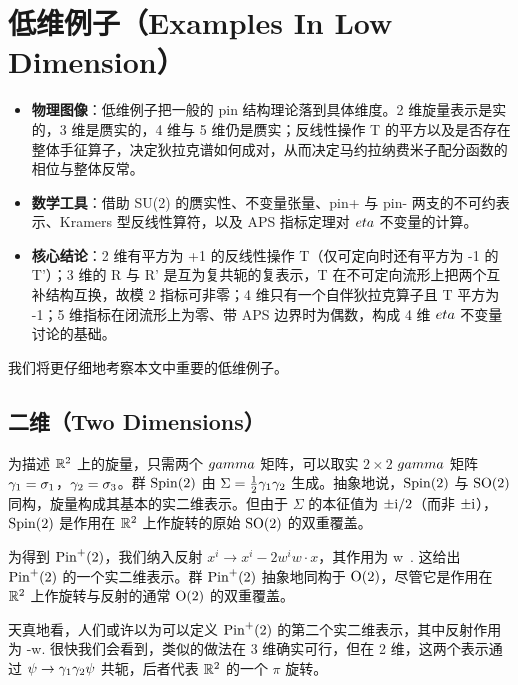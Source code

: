 \section{低维例子（Examples In Low Dimension）}\label{examples}

\begin{keytakeaways}
\begin{itemize}[leftmargin=1.6em,itemsep=0.2em,topsep=0.2em]
  \item \textbf{物理图像}：低维例子把一般的 pin 结构理论落到具体维度。2 维旋量表示是实的，3 维是赝实的，4 维与 5 维仍是赝实；反线性操作 T 的平方以及是否存在整体手征算子，决定狄拉克谱如何成对，从而决定马约拉纳费米子配分函数的相位与整体反常。
  \item \textbf{数学工具}：借助 SU(2) 的赝实性、不变量张量、pin+ 与 pin- 两支的不可约表示、Kramers 型反线性算符，以及 APS 指标定理对 $\\eta$ 不变量的计算。
  \item \textbf{核心结论}：2 维有平方为 +1 的反线性操作 T（仅可定向时还有平方为 -1 的 T'）；3 维的 R 与 R' 是互为复共轭的复表示，T 在不可定向流形上把两个互补结构互换，故模 2 指标可非零；4 维只有一个自伴狄拉克算子且 T 平方为 -1；5 维指标在闭流形上为零、带 APS 边界时为偶数，构成 4 维 $\\eta$ 不变量讨论的基础。
\end{itemize}
\end{keytakeaways}

我们将更仔细地考察本文中重要的低维例子。

\subsection{二维（Two Dimensions）}\label{twod}

为描述 ${\mathbb{R}}^2$ 上的旋量，只需两个 $\\gamma$ 矩阵，可以取实 $2\times 2$ $\\gamma$ 矩阵 ${\gamma}_1=\sigma_1$，${\gamma}_2=\sigma_3$。群 ${\mathrm{Spin}}(2)$ 由 $\Sigma=\frac{1}{2}{\gamma}_1{\gamma}_2$ 生成。抽象地说，${\mathrm{Spin}}(2)$ 与 ${\mathrm{SO}}(2)$ 同构，旋量构成其基本的实二维表示。但由于 $\Sigma$ 的本征值为 $\pm {\mathrm i}/2$（而非 $\pm {\mathrm i}$），${\mathrm{Spin}}(2)$ 是作用在 ${\mathbb{R}}^2$ 上作旋转的原始 ${\mathrm{SO}}(2)$ 的双重覆盖。

为得到 ${\mathrm{Pin}}^+(2)$，我们纳入反射 $x^i\to x^i-2w^i w\cdot x$，其作用为
\be\label{pes} \psi\to \gamma\cdot w\, \psi. \ee
这给出 ${\mathrm{Pin}}^+(2)$ 的一个实二维表示。群 ${\mathrm{Pin}}^+(2)$ 抽象地同构于 ${\mathrm O}(2)$，尽管它是作用在 ${\mathbb{R}}^2$ 上作旋转与反射的通常 ${\mathrm O}(2)$ 的双重覆盖。

天真地看，人们或许以为可以定义 ${\mathrm{Pin}}^+(2)$ 的第二个实二维表示，其中反射作用为
\be\label{nes}\psi\to -\gamma\cdot w\psi. \ee
很快我们会看到，类似的做法在 3 维确实可行，但在 2 维，这两个表示通过 $\psi\to {\gamma}_1{\gamma}_2\psi$ 共轭，后者代表 ${\mathbb{R}}^2$ 的一个 $\pi$ 旋转。

